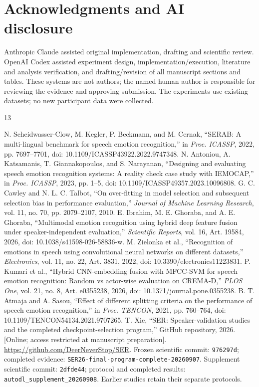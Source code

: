 \documentclass[letterpaper]{article}
\begin{document}
\section{Acknowledgments and AI disclosure}
Anthropic Claude assisted original implementation, drafting and scientific review. OpenAI Codex assisted experiment design, implementation/execution, literature and analysis verification, and drafting/revision of all manuscript sections and tables. These systems are not authors; the named human author is responsible for reviewing the evidence and approving submission. The experiments use existing datasets; no new participant data were collected.
\clearpage
\begin{thebibliography}{13}
\raggedright
{} N. Scheidwasser-Clow, M. Kegler, P. Beckmann, and M. Cernak, ``SERAB: A multi-lingual benchmark for speech emotion recognition,'' in \emph{Proc. ICASSP}, 2022, pp. 7697--7701, doi: 10.1109/ICASSP43922.2022.9747348.
 N. Antoniou, A. Katsamanis, T. Giannakopoulos, and S. Narayanan, ``Designing and evaluating speech emotion recognition systems: A reality check case study with IEMOCAP,'' in \emph{Proc. ICASSP}, 2023, pp. 1--5, doi: 10.1109/ICASSP49357.2023.10096808.
 G. C. Cawley and N. L. C. Talbot, ``On over-fitting in model selection and subsequent selection bias in performance evaluation,'' \emph{Journal of Machine Learning Research}, vol. 11, no. 70, pp. 2079--2107, 2010.
 E. Ibrahim, M. E. Ghoraba, and A. E. Ghoraba, ``Multimodal emotion recognition using hybrid deep feature fusion under speaker-independent evaluation,'' \emph{Scientific Reports}, vol. 16, Art. 19584, 2026, doi: 10.1038/s41598-026-58836-w.
 M. Zielonka et al., ``Recognition of emotions in speech using convolutional neural networks on different datasets,'' \emph{Electronics}, vol. 11, no. 22, Art. 3831, 2022, doi: 10.3390/electronics11223831.
 P. Kumari et al., ``Hybrid CNN-embedding fusion with MFCC-SVM for speech emotion recognition: Random vs actor-wise evaluation on CREMA-D,'' \emph{PLOS One}, vol. 21, no. 8, Art. e0355238, 2026, doi: 10.1371/journal.pone.0355238.
 B. T. Atmaja and A. Sasou, ``Effect of different splitting criteria on the performance of speech emotion recognition,'' in \emph{Proc. TENCON}, 2021, pp. 760--764, doi: 10.1109/TENCON54134.2021.9707265.
 T. Xie, ``SER: Speaker-validation studies and the completed checkpoint-selection program,'' GitHub repository, 2026. [Online; access restricted at manuscript preparation]. \url{https://github.com/DeerNeverStop/SER}. Frozen scientific commit: \texttt{976297d}; completed evidence: \texttt{SER26-final-program-}\allowbreak\texttt{complete-20260907}. Supplement scientific commit: \texttt{2dfde44}; protocol and completed results: \texttt{autodl\_supplement\_20260908}. Earlier studies retain their separate protocols.

\end{thebibliography}
\end{document}
